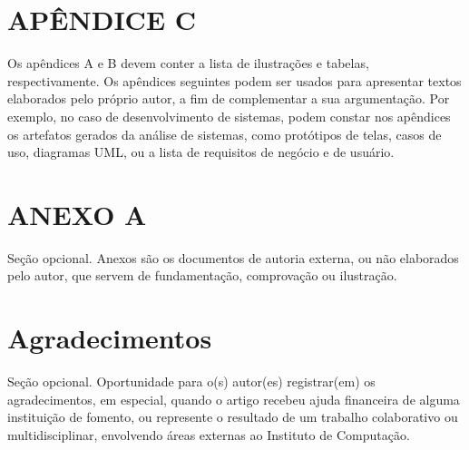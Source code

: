 \documentclass[article,a4paper,12pt,brazil,sumario=tradicional]{abntex2}
\begin{document}
\newpage
\renewcommand{\listfigurename}{APÊNDICE A - Lista de ilustrações}
\listoffigures

\newpage
\renewcommand{\listtablename}{APÊNDICE B - Lista de tabelas}
\listoftables

\begin{appendices}
\newpage
\chapter* {APÊNDICE C}
\noindent
Os apêndices A e B devem conter a lista de ilustrações e tabelas, respectivamente. Os apêndices seguintes podem ser usados para apresentar textos elaborados pelo próprio autor, a fim de complementar a sua argumentação. Por exemplo, no caso de desenvolvimento de sistemas, podem constar nos apêndices os artefatos gerados da análise de sistemas, como protótipos de telas, casos de uso, diagramas UML, ou a lista de requisitos de negócio e de usuário.

\newpage
\chapter*{ANEXO A}
\noindent
Seção opcional. Anexos são os documentos de autoria externa, ou não elaborados pelo autor, que servem de fundamentação, comprovação ou ilustração.
\end{appendices}

\newpage
\chapter*{Agradecimentos}
\noindent
Seção opcional. Oportunidade para o(s) autor(es) registrar(em) os agradecimentos, em especial, quando o artigo recebeu ajuda financeira de alguma instituição de fomento, ou represente o resultado de um trabalho colaborativo ou multidisciplinar, envolvendo áreas externas ao Instituto de Computação.
\end{document}
